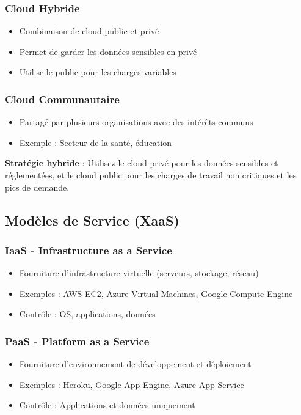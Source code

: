 \documentclass[11pt,a4paper]{article}
\begin{document}
\subsubsection{Cloud Hybride}
\begin{itemize}
    \item Combinaison de cloud public et privé
    \item Permet de garder les données sensibles en privé
    \item Utilise le public pour les charges variables
\end{itemize}

\subsubsection{Cloud Communautaire}
\begin{itemize}
    \item Partagé par plusieurs organisations avec des intérêts communs
    \item Exemple : Secteur de la santé, éducation
\end{itemize}

\begin{tipbox}
\textbf{Stratégie hybride} : Utilisez le cloud privé pour les données sensibles et réglementées, et le cloud public pour les charges de travail non critiques et les pics de demande.
\end{tipbox}

\subsection{Modèles de Service (XaaS)}

\subsubsection{IaaS - Infrastructure as a Service}
\begin{itemize}
    \item Fourniture d'infrastructure virtuelle (serveurs, stockage, réseau)
    \item Exemples : AWS EC2, Azure Virtual Machines, Google Compute Engine
    \item Contrôle : OS, applications, données
\end{itemize}

\subsubsection{PaaS - Platform as a Service}
\begin{itemize}
    \item Fourniture d'environnement de développement et déploiement
    \item Exemples : Heroku, Google App Engine, Azure App Service
    \item Contrôle : Applications et données uniquement
\end{itemize}
\end{document}

